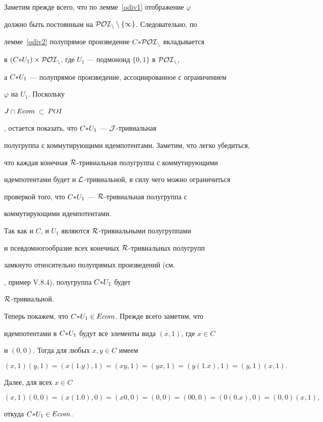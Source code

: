 \begin{pf}


Заметим прежде всего, что по лемме~\ref{odiv1} отображение  $\varphi$


должно быть постоянным на $\cal{POI}_n\setminus\{1\}$. Следовательно, по


лемме~\ref{odiv2} полупрямое произведение $C{*} \cal{POI}_n$ вкладывается


в $(C{*} U_1)\times\cal{POI}_n$, где $U_1$ --- подмоноид $\{0,1\}$ в $\cal{POI}_n$,


а $C{*} U_1$ --- полупрямое произведение, ассоциированное с ограничением


$\varphi$ на $U_1$. Поскольку


$\boldmath{J}$\,$\cap$\,$\boldmath{Ecom}$\,$\subset$\,$\boldmath POI$ 


\cite{HIG2}, остается показать, что $C{*} U_1$ --- $\cal J$-тривиальная


полугруппа с коммутирующими идемпотентами. Заметим, что легко убедиться,


что каждая конечная $\cal R$-тривиальная полугруппа с коммутирующими


идемпотентами будет и $\cal L$-тривиальной, в силу чего можно ограничиться


проверкой того, что $C{*} U_1$ --- $\cal R$-тривиальная полугруппа с


коммутирующими идемпотентами.





Так как и $C$, и $U_1$ являются $\cal R$-тривиальными полугруппами


и псевдомногообразие всех конечных $\cal R$-тривиальных полугрупп


замкнуто относительно полупрямых произведений (см.\


\cite{Eilenberg}, пример V.8.4), полугруппа $C{*} U_1$ будет


$\cal R$-тривиальной.





Теперь покажем, что $C{*} U_1\in$\,$\boldmath{Ecom}$. Прежде всего заметим, что


идемпотентами в $C{*} U_1$ будут все элементы вида $(x,1)$, где $x\in C$


и $(0,0)$. Тогда для любых $x,y\in C$ имеем


$$


(x,1)(y,1)=(x(1.y),1)=(xy,1)=(yx,1)=(y(1.x),1)=(y,1)(x,1).


$$


Далее, для всех $x\in C$


$$


(x,1)(0,0)=(x(1.0),0)=(x0,0)=(0,0)=(00,0)=(0(0.x),0)=(0,0)(x,1),


$$


откуда $C{*} U_1\in$\,$\boldmath{Ecom}$.


\end{pf}





